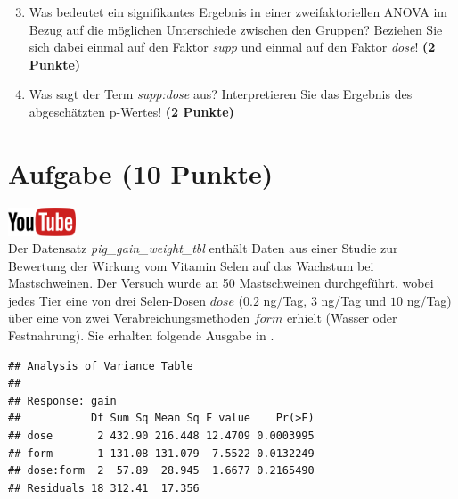 \documentclass[a4paper, 10pt]{scrartcl}\usepackage[]{graphicx}\usepackage[]{xcolor}
\makeatletter
\newenvironment{kframe}{%
 \def\at@end@of@kframe{}%
 \ifinner\ifhmode%
  \def\at@end@of@kframe{\end{minipage}}%
  \begin{minipage}{\columnwidth}%
 \fi\fi%
 \def\FrameCommand##1{\hskip\@totalleftmargin \hskip-\fboxsep
 \colorbox{shadecolor}{##1}\hskip-\fboxsep
     \hskip-\linewidth \hskip-\@totalleftmargin \hskip\columnwidth}%
 \MakeFramed {\advance\hsize-\width
   \@totalleftmargin\z@ \linewidth\hsize
   \@setminipage}}%
 {\par\unskip\endMakeFramed%
 \at@end@of@kframe}
\newenvironment{knitrout}{}{} %
\makeatother
\begin{document}
\begin{enumerate}
  \setcounter{enumi}{2}
\item Was bedeutet ein signifikantes Ergebnis in einer zweifaktoriellen
  ANOVA im Bezug auf die m{\"o}glichen Unterschiede zwischen den Gruppen?
  Beziehen Sie sich dabei einmal auf den Faktor \textit{supp} und einmal
  auf den Faktor \textit{dose}! \textbf{(2 Punkte)}
\item Was sagt der Term \textit{supp:dose} aus? Interpretieren Sie das
  Ergebnis des abgesch{\"a}tzten p-Wertes! \textbf{(2 Punkte)}
\end{enumerate}
 
\clearpage

\section{Aufgabe \hfill (10 Punkte)}

\hfill\href{https://youtu.be/rWTyHXXlYjY}{\includegraphics[width =
  2cm]{img/youtube}}\\[1Ex]


Der Datensatz \textit{pig\_gain\_weight\_tbl} enth{\"a}lt Daten aus einer Studie zur Bewertung
der Wirkung vom Vitamin Selen auf das Wachstum bei Mastschweinen. Der
Versuch wurde an 50 Mastschweinen durchgef{\"u}hrt, wobei
jedes Tier eine von drei Selen-Dosen $dose$ ($0.2$ ng/Tag, $3$ ng/Tag und $10$ ng/Tag)
{\"u}ber eine von zwei Verabreichungsmethoden $form$ erhielt (Wasser oder
Festnahrung). Sie erhalten folgende Ausgabe in \Rlogo.

\begin{knitrout}
\color{fgcolor}\begin{kframe}
\begin{verbatim}
## Analysis of Variance Table
## 
## Response: gain
##           Df Sum Sq Mean Sq F value    Pr(>F)
## dose       2 432.90 216.448 12.4709 0.0003995
## form       1 131.08 131.079  7.5522 0.0132249
## dose:form  2  57.89  28.945  1.6677 0.2165490
## Residuals 18 312.41  17.356
\end{verbatim}
\end{kframe}
\end{knitrout}
\end{document}
